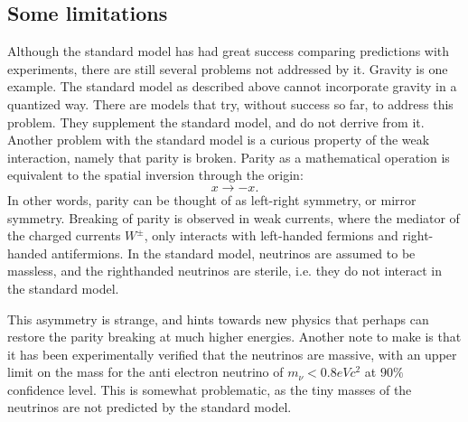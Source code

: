 \subsection*{Some limitations}
Although the standard model has had great success comparing predictions with experiments,
there are still several problems not addressed by it. Gravity is one example. The standard model
as described above cannot incorporate gravity in a quantized way. There 
are models that try, without success so far, to address this problem. They supplement the standard model,
and do not derrive from it. Another problem with the standard model is a curious property of the weak interaction, 
namely that parity is broken. Parity as a mathematical operation is equivalent to the spatial inversion 
through the origin\cite{Thomson:2013zua}:
\begin{equation}
    x \to -x.
\end{equation}
In other words, parity can be thought of as left-right symmetry, or mirror symmetry. Breaking of parity is observed
in weak currents, where the mediator of the charged currents $W^{\pm}$, only interacts with 
left-handed fermions and right-handed antifermions. In the standard model, neutrinos are assumed to be massless, and the righthanded 
neutrinos are sterile, i.e. they do not interact in the standard model. \par 
This asymmetry is strange, and hints towards new physics that perhaps can restore the parity breaking at much higher energies. 
Another note to make is that it has been experimentally verified that the neutrinos are massive\cite{Katrin_neutrinos},
with an upper limit on the mass for the anti electron neutrino of $m_{\nu} < 0.8eVc^2$ at $90\%$ confidence level.
This is somewhat problematic, as the tiny masses of the neutrinos are not predicted by the standard model. 








